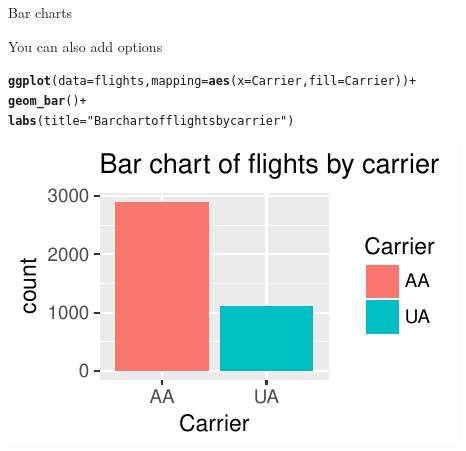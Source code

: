 \documentclass[10pt]{beamer}\usepackage[]{graphicx}\usepackage[]{color}
\makeatletter
\def\maxwidth{ %
  \ifdim\Gin@nat@width>\linewidth
    \linewidth
  \else
    \Gin@nat@width
  \fi
}
\newcommand{\hlstr}[1]{\textcolor[rgb]{0.192,0.494,0.8}{#1}}%
\newcommand{\hlopt}[1]{\textcolor[rgb]{0,0,0}{#1}}%
\newcommand{\hlstd}[1]{\textcolor[rgb]{0.345,0.345,0.345}{#1}}%
\newcommand{\hlkwc}[1]{\textcolor[rgb]{0.333,0.667,0.333}{#1}}%
\newcommand{\hlkwd}[1]{\textcolor[rgb]{0.737,0.353,0.396}{\textbf{#1}}}%
\newenvironment{kframe}{%
 \def\at@end@of@kframe{}%
 \ifinner\ifhmode%
  \def\at@end@of@kframe{\end{minipage}}%
  \begin{minipage}{\columnwidth}%
 \fi\fi%
 \def\FrameCommand##1{\hskip\@totalleftmargin \hskip-\fboxsep
 \colorbox{shadecolor}{##1}\hskip-\fboxsep
     \hskip-\linewidth \hskip-\@totalleftmargin \hskip\columnwidth}%
 \MakeFramed {\advance\hsize-\width
   \@totalleftmargin\z@ \linewidth\hsize
   \@setminipage}}%
 {\par\unskip\endMakeFramed%
 \at@end@of@kframe}
\newenvironment{knitrout}{}{} %
\makeatother
\begin{document}
\begin{frame}[fragile]{Bar charts}

You can also add options

\begin{knitrout}\small
{}\color{fgcolor}\begin{kframe}
\begin{alltt}
\hlkwd{ggplot}\hlstd{(}\hlkwc{data} \hlstd{= flights,} \hlkwc{mapping} \hlstd{=} \hlkwd{aes}\hlstd{(}\hlkwc{x} \hlstd{= Carrier,} \hlkwc{fill} \hlstd{= Carrier))} \hlopt{+}
  \hlkwd{geom_bar}\hlstd{()} \hlopt{+}
  \hlkwd{labs}\hlstd{(}\hlkwc{title} \hlstd{=} \hlstr{"Bar chart of flights by carrier"}\hlstd{)}
\end{alltt}
\end{kframe}
\includegraphics[width=\maxwidth]{figure/unnamed-chunk-15-1} 

\end{knitrout}

\end{frame}
\end{document}
